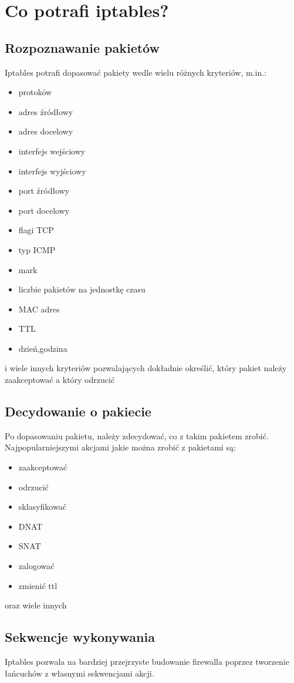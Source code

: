 \documentclass[a4paper,11pt]{article}
\begin{document}
\section{Co potrafi iptables?}
\subsection{Rozpoznawanie pakietów}
Iptables potrafi dopasować pakiety wedle wielu różnych kryteriów, m.in.:
\begin{itemize}
\item protoków
\item adres źródłowy
\item adres docelowy
\item interfejs wejściowy
\item interfejs wyjściowy
\item port źródłowy
\item port docelowy
\item flagi TCP
\item typ ICMP
\item mark
\item liczbie pakietów na jednostkę czasu
\item MAC adres
\item TTL
\item dzień,godzina
\end{itemize}
i wiele innych kryteriów pozwalających dokładnie określić, który pakiet należy zaakceptować a który odrzucić
\subsection{Decydowanie o pakiecie}
Po dopasowaniu pakietu, należy zdecydować, co z takim pakietem zrobić. Najpopularniejszymi akcjami jakie można zrobić z pakietami są:
\begin{itemize}
\item zaakceptować
\item odrzucić
\item sklasyfikować
\item DNAT
\item SNAT
\item zalogować
\item zmienić ttl
\end{itemize}
oraz wiele innych
\subsection{Sekwencje wykonywania}
Iptables pozwala na bardziej przejrzyste budowanie firewalla poprzez tworzenie łańcuchów z własnymi sekwencjami akcji.
\end{document}
